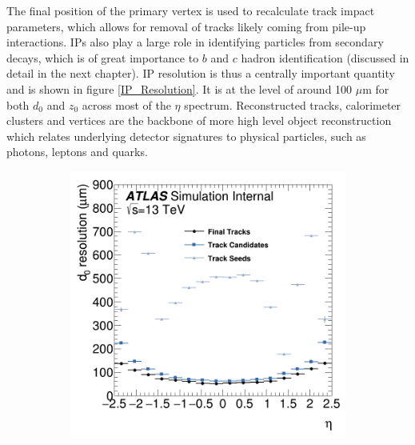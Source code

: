 The final position of the primary vertex is used to recalculate track impact parameters, which allows for removal of 
tracks likely coming from pile-up interactions. IPs also play a large role in identifying particles from secondary decays, 
which is of great importance to $b$ and $c$ hadron identification (discussed in detail in the next chapter). IP resolution 
is thus a centrally important quantity and is shown in figure \ref{IP_Resolution}. It is at the level of around 100 $\mu$m 
for both $d_0$ and $z_0$ across most of the $\eta$ spectrum. Reconstructed tracks, calorimeter clusters and vertices are 
the backbone of more high level object reconstruction which relates underlying detector signatures to physical particles, 
such as photons, leptons and quarks. \par

\begin{figure}
    \centering
    \begin{subfigure}{.49\textwidth}
        \includegraphics[width=\textwidth]{images/Impact_Parameter_Resolution_d0.png}
        \caption{}
        \label{fig:IP_Resolution_d0}
    \end{subfigure}%
    \begin{subfigure}{.49\textwidth}

\end{subfigure}
\end{figure}
